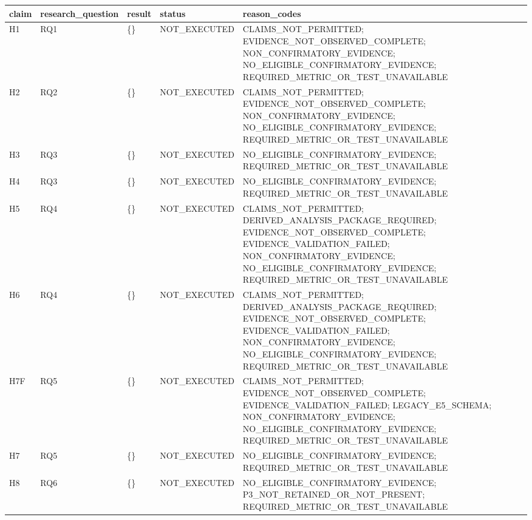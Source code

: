 \begin{tabular}{lllll}
\hline
claim & research\_question & result & status & reason\_codes \\
\hline
H1 & RQ1 & \{\} & NOT\_EXECUTED & CLAIMS\_NOT\_PERMITTED; EVIDENCE\_NOT\_OBSERVED\_COMPLETE; NON\_CONFIRMATORY\_EVIDENCE; NO\_ELIGIBLE\_CONFIRMATORY\_EVIDENCE; REQUIRED\_METRIC\_OR\_TEST\_UNAVAILABLE \\
H2 & RQ2 & \{\} & NOT\_EXECUTED & CLAIMS\_NOT\_PERMITTED; EVIDENCE\_NOT\_OBSERVED\_COMPLETE; NON\_CONFIRMATORY\_EVIDENCE; NO\_ELIGIBLE\_CONFIRMATORY\_EVIDENCE; REQUIRED\_METRIC\_OR\_TEST\_UNAVAILABLE \\
H3 & RQ3 & \{\} & NOT\_EXECUTED & NO\_ELIGIBLE\_CONFIRMATORY\_EVIDENCE; REQUIRED\_METRIC\_OR\_TEST\_UNAVAILABLE \\
H4 & RQ3 & \{\} & NOT\_EXECUTED & NO\_ELIGIBLE\_CONFIRMATORY\_EVIDENCE; REQUIRED\_METRIC\_OR\_TEST\_UNAVAILABLE \\
H5 & RQ4 & \{\} & NOT\_EXECUTED & CLAIMS\_NOT\_PERMITTED; DERIVED\_ANALYSIS\_PACKAGE\_REQUIRED; EVIDENCE\_NOT\_OBSERVED\_COMPLETE; EVIDENCE\_VALIDATION\_FAILED; NON\_CONFIRMATORY\_EVIDENCE; NO\_ELIGIBLE\_CONFIRMATORY\_EVIDENCE; REQUIRED\_METRIC\_OR\_TEST\_UNAVAILABLE \\
H6 & RQ4 & \{\} & NOT\_EXECUTED & CLAIMS\_NOT\_PERMITTED; DERIVED\_ANALYSIS\_PACKAGE\_REQUIRED; EVIDENCE\_NOT\_OBSERVED\_COMPLETE; EVIDENCE\_VALIDATION\_FAILED; NON\_CONFIRMATORY\_EVIDENCE; NO\_ELIGIBLE\_CONFIRMATORY\_EVIDENCE; REQUIRED\_METRIC\_OR\_TEST\_UNAVAILABLE \\
H7F & RQ5 & \{\} & NOT\_EXECUTED & CLAIMS\_NOT\_PERMITTED; EVIDENCE\_NOT\_OBSERVED\_COMPLETE; EVIDENCE\_VALIDATION\_FAILED; LEGACY\_E5\_SCHEMA; NON\_CONFIRMATORY\_EVIDENCE; NO\_ELIGIBLE\_CONFIRMATORY\_EVIDENCE; REQUIRED\_METRIC\_OR\_TEST\_UNAVAILABLE \\
H7 & RQ5 & \{\} & NOT\_EXECUTED & NO\_ELIGIBLE\_CONFIRMATORY\_EVIDENCE; REQUIRED\_METRIC\_OR\_TEST\_UNAVAILABLE \\
H8 & RQ6 & \{\} & NOT\_EXECUTED & NO\_ELIGIBLE\_CONFIRMATORY\_EVIDENCE; P3\_NOT\_RETAINED\_OR\_NOT\_PRESENT; REQUIRED\_METRIC\_OR\_TEST\_UNAVAILABLE \\
\hline
\end{tabular}
